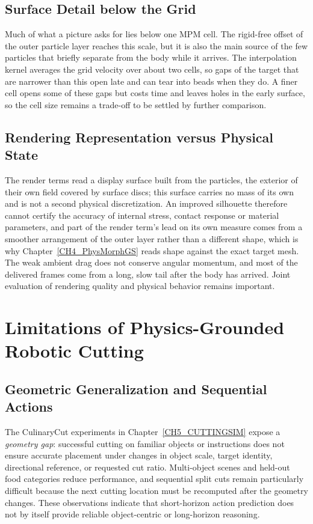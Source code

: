 \subsection{Surface Detail below the Grid}
Much of what a picture asks for lies below one MPM cell. The rigid-free offset of the outer particle layer reaches this scale, but it is also the main source of the few particles that briefly separate from the body while it arrives. The interpolation kernel averages the grid velocity over about two cells, so gaps of the target that are narrower than this open late and can tear into beads when they do. A finer cell opens some of these gaps but costs time and leaves holes in the early surface, so the cell size remains a trade-off to be settled by further comparison.

\subsection{Rendering Representation versus Physical State}
The render terms read a display surface built from the particles, the exterior of their own field covered by surface discs; this surface carries no mass of its own and is not a second physical discretization. An improved silhouette therefore cannot certify the accuracy of internal stress, contact response or material parameters, and part of the render term's lead on its own measure comes from a smoother arrangement of the outer layer rather than a different shape, which is why Chapter~\ref{CH4_PhysMorphGS} reads shape against the exact target mesh. The weak ambient drag does not conserve angular momentum, and most of the delivered frames come from a long, slow tail after the body has arrived. Joint evaluation of rendering quality and physical behavior remains important.

\section{Limitations of Physics-Grounded Robotic Cutting}
\label{subsec:lim-cutting}

\subsection{Geometric Generalization and Sequential Actions}
The CulinaryCut experiments in Chapter~\ref{CH5_CUTTINGSIM} expose a \emph{geometry gap}: successful cutting on familiar objects or instructions does not ensure accurate placement under changes in object scale, target identity, directional reference, or requested cut ratio. Multi-object scenes and held-out food categories reduce performance, and sequential split cuts remain particularly difficult because the next cutting location must be recomputed after the geometry changes. These observations indicate that short-horizon action prediction does not by itself provide reliable object-centric or long-horizon reasoning.

